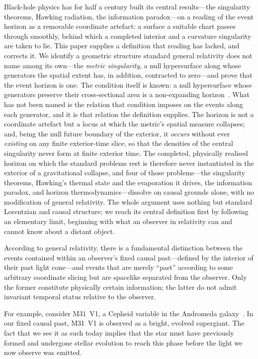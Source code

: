 \documentclass[11pt,a4paper]{article}
\theoremstyle{plain}
\theoremstyle{remark}
\begin{document}
Black-hole physics has for half a century built its central results---the singularity theorems, Hawking radiation, the information paradox---on a reading of the event horizon as a removable coordinate artefact: a surface a suitable chart passes through smoothly, behind which a completed interior and a curvature singularity are taken to lie. This paper supplies a definition that reading has lacked, and corrects it. We identify a geometric structure standard general relativity does not name among its own---the \emph{metric singularity}, a null hypersurface along whose generators the spatial extent has, in addition, contracted to zero---and prove that the event horizon is one. The condition itself is known: a null hypersurface whose generators preserve their cross-sectional area is a non-expanding horizon~\cite{AshtekarKrishnan2004}. What has not been named is the relation that condition imposes on the events along each generator, and it is that relation the definition supplies. The horizon is not a coordinate artefact but a locus at which the metric's spatial measure collapses; and, being the null future boundary of the exterior, it \emph{occurs} without ever \emph{existing} on any finite exterior-time slice, so that the densities of the central singularity never form at finite exterior time. The completed, physically realised horizon on which the standard problems rest is therefore never instantiated in the exterior of a gravitational collapse, and four of those problems---the singularity theorems, Hawking's thermal state and the evaporation it drives, the information paradox, and horizon thermodynamics---dissolve on causal grounds alone, with no modification of general relativity. The whole argument uses nothing but standard Lorentzian and causal structure; we reach its central definition first by following an elementary limit, beginning with what an observer in relativity can and cannot know about a distant object.

According to general relativity, there is a fundamental distinction between the events contained within an observer's fixed causal past---defined by the interior of their past light cone---and events that are merely ``past'' according to some arbitrary coordinate slicing but are spacelike separated from the observer. Only the former constitute physically certain information; the latter do not admit invariant temporal status relative to the observer.

For example, consider M31~V1, a Cepheid variable in the Andromeda galaxy~\cite{Hubble1929M31}. In our fixed causal past, M31~V1 is observed as a bright, evolved supergiant. The fact that we see it as such today implies that the star must have previously formed and undergone stellar evolution to reach this phase before the light we now observe was emitted.
\end{document}
